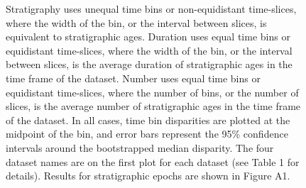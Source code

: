 \documentclass[12pt,a4paper]{article}
\begin{document}
\begin{figure}[!htbp]
{    Stratigraphy uses unequal time bins or non-equidistant time-slices, where the width of the bin, or the interval between slices, is equivalent to stratigraphic ages. 
    Duration uses equal time bins or equidistant time-slices, where the width of the bin, or the interval between slices, is the average duration of stratigraphic ages in the time frame of the dataset. 
    Number uses equal time bins or equidistant time-slices, where the number of bins, or the number of slices, is the average number of stratigraphic ages in the time frame of the dataset. 
    In all cases, time bin disparities are plotted at the midpoint of the bin, and error bars represent the 95\% confidence intervals around the bootstrapped median disparity.
    The four dataset names are on the first plot for each dataset (see Table 1 for details).
    Results for stratigraphic epochs are shown in Figure A1.}
    \label{figure:dtt3}
  \end{figure}   
\end{document}
